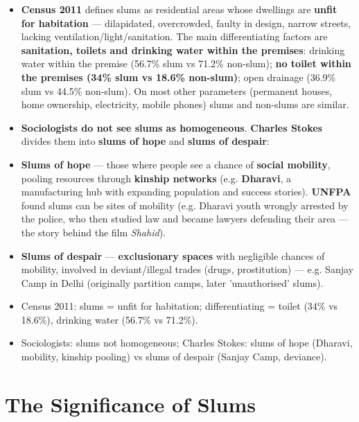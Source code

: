 \begin{KeyConcept}
\begin{itemize}
\item \textbf{Census 2011} defines slums as residential areas whose dwellings are \textbf{unfit for habitation} --- dilapidated, overcrowded, faulty in design, narrow streets, lacking ventilation/light/sanitation. The main differentiating factors are \textbf{sanitation, toilets and drinking water within the premises}: drinking water within the premise (56.7\% slum vs 71.2\% non-slum); \textbf{no toilet within the premises (34\% slum vs 18.6\% non-slum)}; open drainage (36.9\% slum vs 44.5\% non-slum). On most other parameters (permanent houses, home ownership, electricity, mobile phones) slums and non-slums are similar.
\item \textbf{Sociologists do not see slums as homogeneous}. \textbf{Charles Stokes} divides them into \textbf{slums of hope} and \textbf{slums of despair}:
\item \textbf{Slums of hope} --- those where people see a chance of \textbf{social mobility}, pooling resources through \textbf{kinship networks} (e.g. \textbf{Dharavi}, a manufacturing hub with expanding population and success stories). \textbf{UNFPA} found slums can be sites of mobility (e.g. Dharavi youth wrongly arrested by the police, who then studied law and became lawyers defending their area --- the story behind the film \emph{Shahid}).
\item \textbf{Slums of despair} --- \textbf{exclusionary spaces} with negligible chances of mobility, involved in deviant/illegal trades (drugs, prostitution) --- e.g. Sanjay Camp in Delhi (originally partition camps, later 'unauthorised' slums).
\end{itemize}
\end{KeyConcept}

\begin{QuickRevision}
\begin{itemize}
\item Census 2011: slums = unfit for habitation; differentiating = toilet (34\% vs 18.6\%), drinking water (56.7\% vs 71.2\%).
\item Sociologists: slums not homogeneous; Charles Stokes: slums of hope (Dharavi, mobility, kinship pooling) vs slums of despair (Sanjay Camp, deviance).
\end{itemize}
\end{QuickRevision}

\section{The Significance of Slums}

